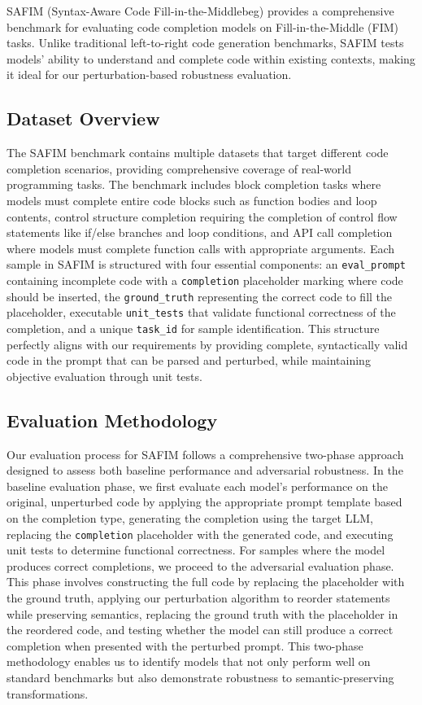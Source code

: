 \documentclass[%
thesis=student,%
coverpage=false,%
titlepage=false,%
headmarks=true, %
english,%
font=libertine, %
math=newpxtx, %
BCOR=5mm,%
coverBCOR=11mm%
]{tum-templates/book/tumbook}
\begin{document}
SAFIM (Syntax-Aware Code Fill-in-the-Middlebeg) \cite{Gong2024} provides a comprehensive benchmark for evaluating code completion models on Fill-in-the-Middle (FIM) tasks. Unlike traditional left-to-right code generation benchmarks, SAFIM tests models' ability to understand and complete code within existing contexts, making it ideal for our perturbation-based robustness evaluation.

\subsection{Dataset Overview}

The SAFIM benchmark contains multiple datasets that target different code completion scenarios, providing comprehensive coverage of real-world programming tasks. The benchmark includes block completion tasks where models must complete entire code blocks such as function bodies and loop contents, control structure completion requiring the completion of control flow statements like if/else branches and loop conditions, and API call completion where models must complete function calls with appropriate arguments. Each sample in SAFIM is structured with four essential components: an \texttt{eval\_prompt} containing incomplete code with a \texttt{{{completion}}} placeholder marking where code should be inserted, the \texttt{ground\_truth} representing the correct code to fill the placeholder, executable \texttt{unit\_tests} that validate functional correctness of the completion, and a unique \texttt{task\_id} for sample identification. This structure perfectly aligns with our requirements by providing complete, syntactically valid code in the prompt that can be parsed and perturbed, while maintaining objective evaluation through unit tests.

\subsection{Evaluation Methodology}

Our evaluation process for SAFIM follows a comprehensive two-phase approach designed to assess both baseline performance and adversarial robustness. In the baseline evaluation phase, we first evaluate each model's performance on the original, unperturbed code by applying the appropriate prompt template based on the completion type, generating the completion using the target LLM, replacing the \texttt{{{completion}}} placeholder with the generated code, and executing unit tests to determine functional correctness. For samples where the model produces correct completions, we proceed to the adversarial evaluation phase. This phase involves constructing the full code by replacing the placeholder with the ground truth, applying our perturbation algorithm to reorder statements while preserving semantics, replacing the ground truth with the placeholder in the reordered code, and testing whether the model can still produce a correct completion when presented with the perturbed prompt. This two-phase methodology enables us to identify models that not only perform well on standard benchmarks but also demonstrate robustness to semantic-preserving transformations.
\end{document}
